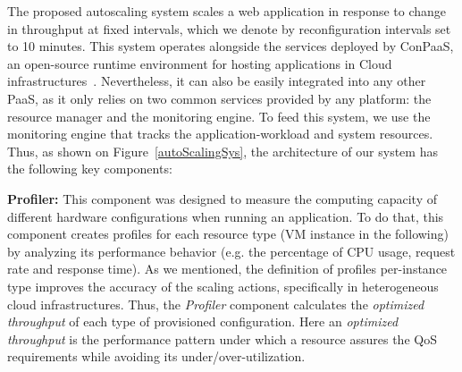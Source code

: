 
The proposed autoscaling system scales a web application in response to change in throughput at fixed intervals, which we denote by reconfiguration intervals set to 10 minutes.  This system operates alongside the services deployed by ConPaaS, an open-source runtime environment for hosting applications in Cloud infrastructures~\cite{conpaasIC}. Nevertheless, it can also be easily integrated into any other PaaS, as it only relies on two common services provided by any platform: the resource manager and the monitoring engine. To feed this system, we use the monitoring engine that tracks the application-workload and system resources. Thus, as shown on Figure~\ref{autoScalingSys}, the architecture of our system has the following key components:





\textbf{Profiler:} This component was designed to measure the computing capacity of different hardware configurations when running an application. To do that, this component creates profiles for each resource type (VM instance in the following) by analyzing its performance behavior (e.g. the percentage of CPU usage, request rate and response time).  As we mentioned, the definition of profiles per-instance type improves the accuracy of the scaling actions, specifically in heterogeneous cloud infrastructures. Thus, the \emph{Profiler} component calculates the \emph{optimized throughput} of each type of provisioned configuration. Here an \emph{optimized throughput} is the performance pattern under which a resource assures the QoS requirements while avoiding its under/over-utilization.







